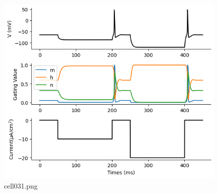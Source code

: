 \begin{figure}[ht]
	\centering
	\includegraphics[scale=0.8, max width=\linewidth]{./fig/neuron-model/hodgkin-huxley/cell031.png}
	\caption{cell031.png}
	\label{cell031.png}
\end{figure}